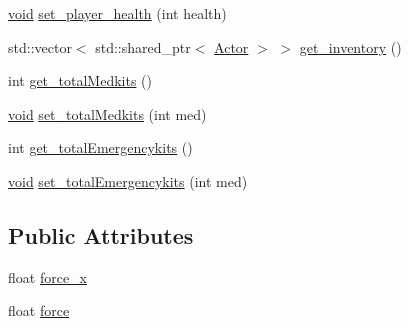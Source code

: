 \begin{DoxyCompactItemize}
\item 
\hyperlink{imgui__impl__opengl3__loader_8h_ac668e7cffd9e2e9cfee428b9b2f34fa7}{void} \hyperlink{classPlayer__Actor_ab68ac6c1ab9b89a379addf1d27a31004}{set\+\_\+player\+\_\+health} (int health)
\item 
std\+::vector$<$ std\+::shared\+\_\+ptr$<$ \hyperlink{classActor}{Actor} $>$ $>$ \hyperlink{classPlayer__Actor_afd091231c5f7121494754551fa527723}{get\+\_\+inventory} ()
\item 
int \hyperlink{classPlayer__Actor_a89b8a232d523618cbc5448241d69f130}{get\+\_\+total\+Medkits} ()
\item 
\hyperlink{imgui__impl__opengl3__loader_8h_ac668e7cffd9e2e9cfee428b9b2f34fa7}{void} \hyperlink{classPlayer__Actor_ae38092310fdcd9bee1ceadc701b4c1e5}{set\+\_\+total\+Medkits} (int med)
\item 
int \hyperlink{classPlayer__Actor_a547276af2f248580a7503d259a25d644}{get\+\_\+total\+Emergencykits} ()
\item 
\hyperlink{imgui__impl__opengl3__loader_8h_ac668e7cffd9e2e9cfee428b9b2f34fa7}{void} \hyperlink{classPlayer__Actor_a21ffd74ff85ab1a5580b957b62794935}{set\+\_\+total\+Emergencykits} (int med)
\end{DoxyCompactItemize}
\subsection*{Public Attributes}
\begin{DoxyCompactItemize}
\item 
float \hyperlink{classPlayer__Actor_a632b39390d1b9ff73255aad07832ae33}{force\+\_\+x}
\item 
float \hyperlink{classPlayer__Actor_aa2b9ef0e6332e699e2f1b1303fb8d1a6}{force}
\end{DoxyCompactItemize}
